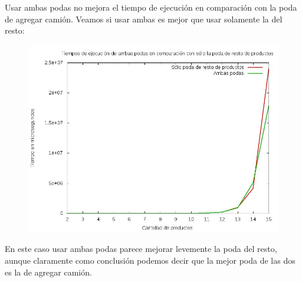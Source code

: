 Usar ambas podas no mejora el tiempo de ejecución en comparación con la poda de agregar camión. Veamos si usar ambas es mejor que usar solamente la del resto:

\begin{figure}[H]
	\begin{minipage}[t]{\linewidth}
		\centering
		\includegraphics[width=\textwidth]{comparacion_poda_resto_con_ambas_podas.jpg}
		\label{fig:p3_comparacion_poda_resto_con_ambas_podas}
	\end{minipage}
\end{figure}

En este caso usar ambas podas parece mejorar levemente la poda del resto, aunque claramente como conclusión podemos decir que la mejor poda de las dos es la de agregar camión.
